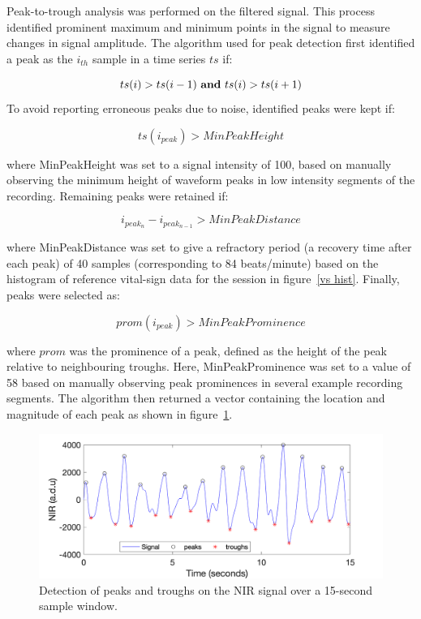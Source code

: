 Peak-to-trough analysis was performed on the filtered signal. This process identified prominent maximum and minimum points in the signal to measure changes in signal amplitude. The algorithm used for peak detection first identified a peak as the $i _{th}$ sample in a time series $ts$ if: 

\begin{equation}
	ts(i) > ts(i-1)\textrm{ \textbf{and} } ts(i) > ts(i+1)
\end{equation}
To avoid reporting erroneous peaks due to noise, identified peaks were kept if:

\begin{equation}
	ts(i_{peak})  > MinPeakHeight
\end{equation}

where MinPeakHeight was set to a signal intensity of 100, based on manually observing the minimum height of waveform peaks in low intensity segments of the recording. Remaining peaks were retained if:

\begin{equation}
	i_{peak_{n}} - i_{peak_{n-1}}  >  MinPeakDistance
\end{equation}

where MinPeakDistance was set to give a refractory period (a recovery time after each peak) of 40 samples (corresponding to 84 beats/minute) based on the histogram of reference vital-sign data for the session in figure~\ref{vs hist}. Finally, peaks were selected as:

\begin{equation}
	prom(i_{peak}) > MinPeakProminence
\end{equation}

where $prom$ was the prominence of a peak, defined as the height of the peak relative to neighbouring troughs. Here, MinPeakProminence was set to a value of 58 based on manually observing peak prominences in several example recording segments. The algorithm then returned a vector containing the location and magnitude of each peak as shown in figure~\ref{peak}.

\begin{figure}[!ht]
\centering
\includegraphics[width=0.6\linewidth,keepaspectratio=true]{./figures/peakdetector.png}
    \caption{Detection of peaks and troughs on the NIR signal over a 15-second sample window.}
  \label{peak}
\end{figure}

